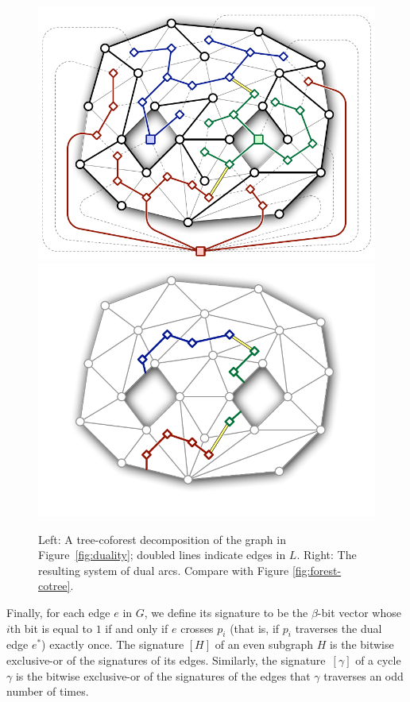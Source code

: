 \documentclass[11pt,twoside]{article}
\let\cycle\gamma
\def\dualarc{p}
\begin{document}
\begin{figure}[htb]
\centering\footnotesize\sf
\includegraphics[scale=0.45]{Fig/tree-coforest2} \qquad
\includegraphics[scale=0.45]{Fig/tree-coforest-arcs2}
\caption{Left: A tree-coforest decomposition of the graph in Figure~\ref{fig:duality}; doubled lines indicate edges in $L$.
Right: The resulting system of dual arcs.  Compare with Figure \ref{fig:forest-cotree}.}
\label{fig:tree-coforest}
\end{figure}

Finally, for each edge $e$ in $G$, we define its signature \EMPH{$[e]$} to be the $\beta$-bit vector whose $i$th bit is equal to $1$ if and only if $e$ crosses $\dualarc_i$ (that is, if $\dualarc_i$ traverses the dual edge $e^*$) exactly once.  The signature $[H]$ of an even subgraph $H$ is the bitwise exclusive-or of the signatures of its edges.  Similarly, the signature~$[\cycle]$ of a cycle $\cycle$ is the bitwise exclusive-or of the signatures of the edges that $\cycle$ traverses an odd number of times.
\end{document}
